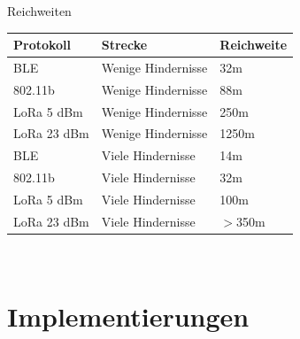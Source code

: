 \documentclass[18pt]{beamer}
\begin{document}
\begin{frame}{Reichweiten}
	\centering
	\begin{tabular}{l|l|l}
		Protokoll & Strecke & Reichweite \\
		\hline
		BLE & Wenige Hindernisse & 32m \\
		802.11b & Wenige Hindernisse & 88m \\
		LoRa 5 dBm & Wenige Hindernisse & 250m \\
		LoRa 23 dBm & Wenige Hindernisse & 1250m \\
		\hline
		BLE & Viele Hindernisse & 14m \\
		802.11b & Viele Hindernisse & 32m \\
		LoRa 5 dBm & Viele Hindernisse & 100m \\
		LoRa 23 dBm & Viele Hindernisse & $>$350m \\
	\end{tabular}\\
\end{frame}

\section{Implementierungen}
\end{document}
